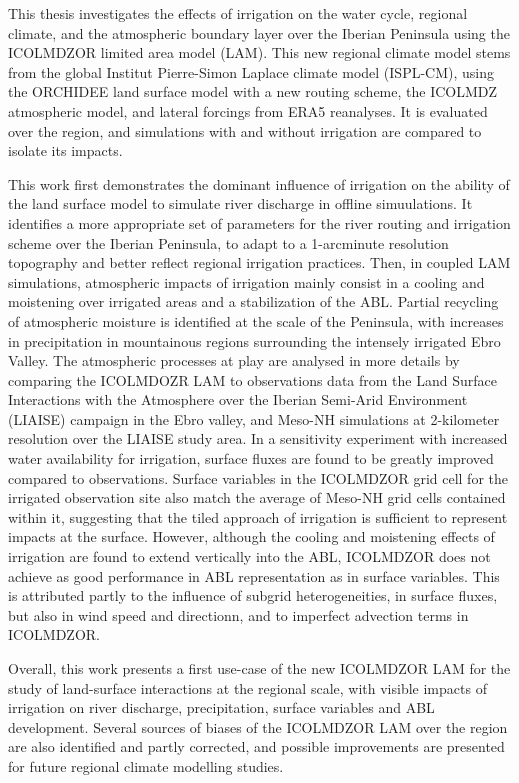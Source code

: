 \documentclass{report}
\begin{document}
This thesis investigates the effects of irrigation on the water cycle, regional climate, and the atmospheric boundary layer over the Iberian Peninsula using the ICOLMDZOR limited area model (LAM). This new regional climate model stems from the global Institut Pierre-Simon Laplace climate model (ISPL-CM), using the ORCHIDEE land surface model with a new routing scheme, the ICOLMDZ atmospheric model, and lateral forcings from ERA5 reanalyses.
It is evaluated over the region, and simulations with and without irrigation are compared to isolate its impacts.

This work first demonstrates the dominant influence of irrigation on the ability of the land surface model to simulate river discharge in offline simuulations. It identifies a more appropriate set of parameters for the river routing and irrigation scheme over the Iberian Peninsula, to adapt to a 1-arcminute resolution topography and better reflect regional irrigation practices. 
Then, in coupled LAM simulations, atmospheric impacts of irrigation mainly consist in a cooling and moistening over irrigated areas and a stabilization of the ABL. Partial recycling of atmospheric moisture is identified at the scale of the Peninsula, with increases in precipitation in mountainous regions surrounding the intensely irrigated Ebro Valley.
The atmospheric processes at play are analysed in more details by comparing the ICOLMDOZR LAM to observations data from the Land Surface Interactions with the Atmosphere over the Iberian Semi-Arid Environment (LIAISE) campaign in the Ebro valley, and Meso-NH simulations at 2-kilometer resolution over the LIAISE study area.
In a sensitivity experiment with increased water availability for irrigation, surface fluxes are found to be greatly improved compared to observations. Surface variables in the ICOLMDZOR grid cell for the irrigated observation site also match the average of Meso-NH grid cells contained within it, suggesting that the tiled approach of irrigation is sufficient to represent impacts at the surface. However, although the cooling and moistening effects of irrigation are found to extend vertically into the ABL, ICOLMDZOR does not achieve as good performance in ABL representation as in surface variables. This is attributed partly to the influence of subgrid heterogeneities, in surface fluxes, but also in wind speed and directionn, and to imperfect advection terms in ICOLMDZOR.

Overall, this work presents a first use-case of the new ICOLMDZOR LAM for the study of land-surface interactions at the regional scale, with visible impacts of irrigation on river discharge, precipitation, surface variables and ABL development.
Several sources of biases of the ICOLMDZOR LAM over the region are also identified and partly corrected, and possible improvements are presented for future regional climate modelling studies.
\end{document}
